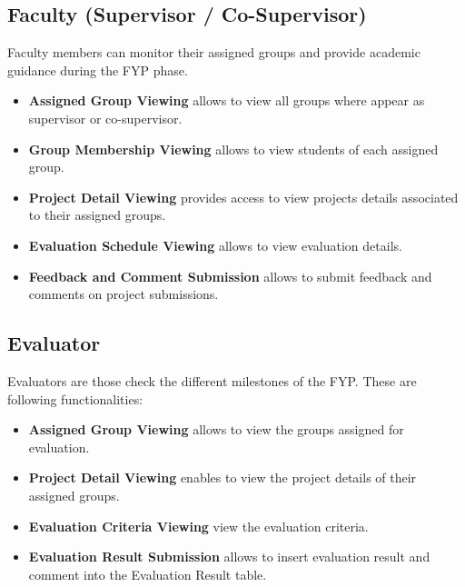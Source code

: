 \documentclass[12pt,a4paper]{report}
\begin{document}
\subsection{Faculty (Supervisor / Co-Supervisor)}

Faculty members can  monitor their assigned groups and provide 
academic guidance during the FYP phase.

\begin{itemize}
    \item \textbf{Assigned Group Viewing} allows to view all groups where appear as supervisor or co-supervisor.
    
    \item \textbf{Group Membership Viewing} allows to view  students of each assigned group.
    
    \item \textbf{Project Detail Viewing} provides access to view projects details associated to their assigned groups.
    
    \item \textbf{Evaluation Schedule Viewing} allows  to view  evaluation details.
    
    \item \textbf{Feedback and Comment Submission} allows to submit  feedback and comments on project submissions.
\end{itemize}

\subsection{Evaluator}

Evaluators are those check the different milestones of the FYP. These are following functionalities:

\begin{itemize}
    \item \textbf{Assigned Group Viewing} allows to view the groups assigned for evaluation.
    
    \item \textbf{Project Detail Viewing} enables to view the project details of their assigned groups.
    
    \item \textbf{Evaluation Criteria Viewing}  view the evaluation criteria.
    
    \item \textbf{Evaluation Result Submission} allows to insert evaluation result and comment into the Evaluation Result table.
\end{itemize}
\end{document}

